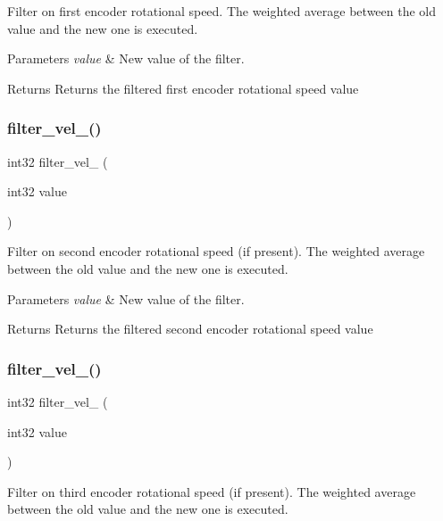 Filter on first encoder rotational speed. The weighted average between the old value and the new one is executed.


\begin{DoxyParams}{Parameters}
{\em value} & New value of the filter.\\
\hline
\end{DoxyParams}
\begin{DoxyReturn}{Returns}
Returns the filtered first encoder rotational speed value 
\end{DoxyReturn}
\mbox{\label{utils_8c_aa24da14909e1e213a2d5f5522752f2c9}} 
\subsubsection{filter\+\_\+vel\+\_()}
{\footnotesize\ttfamily int32 filter\+\_\+vel\+\_ (\begin{DoxyParamCaption}\item[{int32}]{value }\end{DoxyParamCaption})}

Filter on second encoder rotational speed (if present). The weighted average between the old value and the new one is executed.


\begin{DoxyParams}{Parameters}
{\em value} & New value of the filter.\\
\hline
\end{DoxyParams}
\begin{DoxyReturn}{Returns}
Returns the filtered second encoder rotational speed value 
\end{DoxyReturn}
\mbox{\label{utils_8c_a44d5627a5b0d37a70edddad83a3362ea}} 
\subsubsection{filter\+\_\+vel\+\_()}
{\footnotesize\ttfamily int32 filter\+\_\+vel\+\_ (\begin{DoxyParamCaption}\item[{int32}]{value }\end{DoxyParamCaption})}

Filter on third encoder rotational speed (if present). The weighted average between the old value and the new one is executed.


